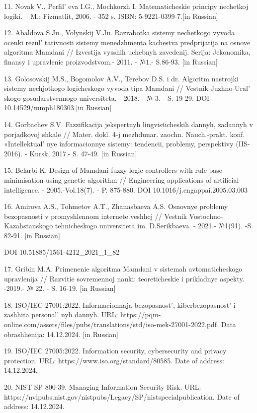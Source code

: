 \begin{references}
11. Novak V., Perfil' eva I.G., Mochkorzh I.
Matematicheskie principy nechetkoj logiki. -- M.: Fizmatlit, 2006. - 352
s. ISBN: 5-9221-0399-7.{[}in Russian{]}

12. Abaldova S.Ju., Volynskij V.Ju. Razrabotka sistemy nechetkogo vyvoda
ocenki rezul' tativnosti sistemy menedzhmenta kachestva
predprijatija na osnove algoritma Mamdani // Izvestija vysshih uchebnyh
zavedenij. Serija: Jekonomika, finansy i upravlenie proizvodstvom.-
2011. - №1.- S.86-93. {[}in Russian{]}

13. Golosovskij M.S., Bogomolov A.V., Terebov D.S. i dr. Algoritm
nastrojki sistemy nechjotkogo logicheskogo vyvoda tipa Mamdani //
Vestnik Juzhno-Ural' skogo gosudarstvennogo universiteta.
- 2018. - № 3. - S. 19-29. DOI 10.14529/mmph180303.{[}in Russian{]}

14. Gorbachev S.V. Fazzifikacija jekspertnyh lingvisticheskih dannyh,
zadannyh v porjadkovoj shkale // Mater. dokl. 4-j mezhdunar. zaochn.
Nauch.-prakt. konf. «Intellektual' nye informacionnye
sistemy: tendencii, problemy, perspektivy (IIS-2016). - Kursk, 2017.- S.
47-49. {[}in Russian{]}

15. Belarbi K. Design of Mamdani fuzzy logic controllers with rule base
minimisation using genetic algorithm // Engineering applications of
artificial intelligence. - 2005.-Vol.18(7). - P. 875-880. DOI
10.1016/j.engappai.2005.03.003

16. Amirova A.S., Tohmetov A.T., Zhanasbaeva A.S. Osnovnye problemy
bezopasnosti v promyshlennom internete veshhej // Vestnik
Vostochno-Kazahstanskogo tehnicheskogo universiteta im. D.Serikbaeva. -
2021.- №1(91). -S. 82-91. {[}in Russian{]}

DOI 10.51885/1561-4212\_2021\_1\_82

17. Gribin M.A. Primenenie algoritma Mamdani v sistemah avtomaticheskogo
upravlenija // Razvitie sovremennoj nauki: teoreticheskie i prikladnye
aspekty. -2019.- № 22. - S. 16-19. {[}in Russian{]}

18. ISO/IEC 27001:2022. Informacionnaja bezopasnost',
kiberbezopasnost'{} i zashhita
personal' nyh dannyh. URL:
https://pqm-online.com/assets/files/pubs/translations/std/iso-mek-27001-2022.pdf.
Data obrashhenija: 14.12.2024. {[}in Russian{]}

19. ISO/IEC 27005:2022. Information security, cybersecurity and privacy
protection. URL: https://www.iso.org/standard/80585. Date of address:
14.12.2024.

20. NIST SP 800-39. Managing Information Security Risk. URL:
https://nvlpubs.nist.gov/nistpubs/Legacy/SP/nistspecialpublication. Date
of address: 14.12.2024.


\end{references}

